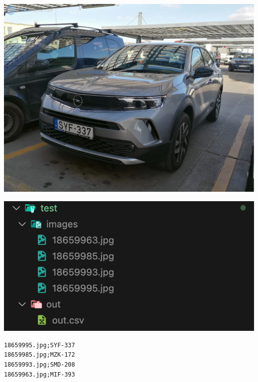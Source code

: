 \documentclass[aspectratio=169]{beamer}
\begin{document}
\begin{frame}[fragile]
\begin{minipage}{.33\textwidth}
		\includegraphics[height=.6\textwidth]{images/test-img-4.jpg}
	\end{minipage}\begin{minipage}{.33\textwidth}
		\includegraphics[height=.6\textwidth]{images/test_folder.png}

		\begin{verbatim}
18659995.jpg;SYF-337
18659985.jpg;MZK-172
18659993.jpg;SMD-208
18659963.jpg;MIF-393
		\end{verbatim}
	\end{minipage}
\end{frame}
\end{document}
